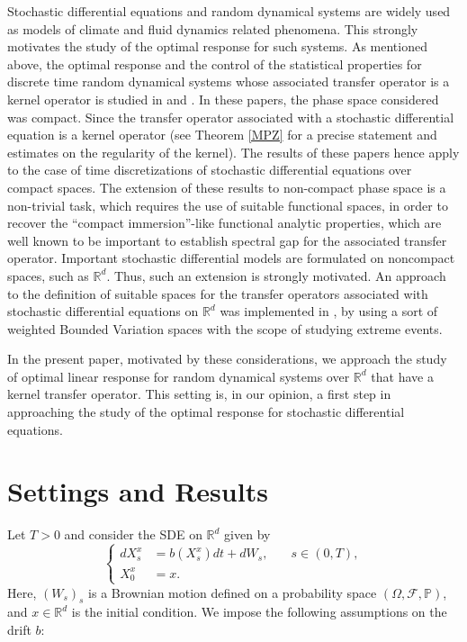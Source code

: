 \documentclass{amsart}
\begin{document}
  Stochastic differential equations and random dynamical systems are widely used as models of climate and fluid dynamics related phenomena.  This strongly motivates the study of the optimal response for such systems.
  As mentioned above, the  optimal response  and the control of the statistical properties for discrete time  random dynamical systems  whose associated transfer operator is a kernel operator is studied in \cite{AFG22} and \cite{GG19}. In these papers, the phase space considered was compact.
   Since the transfer operator associated with a stochastic differential equation is a kernel operator (see Theorem \ref{MPZ} for a precise statement and estimates on the regularity of the kernel).
The results of these papers hence apply to the case of time discretizations of stochastic differential equations over compact spaces. The extension of these results to non-compact phase space is a non-trivial task, which requires the use of suitable functional spaces, in order to recover the ``compact immersion''-like  functional analytic properties, which are well known to be important to establish  spectral gap  for the associated transfer operator. 
Important stochastic differential models are formulated on noncompact spaces, such as $\mathbb{R}^d$. 
Thus, such an extension is strongly motivated.
An approach to the definition of suitable spaces for the transfer operators associated with stochastic differential equations on $\mathbb{R}^d$ was implemented in \cite{FGGV24}, by using a sort of weighted Bounded Variation spaces with the scope of studying extreme events.

In the present paper, motivated by these considerations, we approach the study of optimal linear response for random dynamical systems over $\mathbb{R}^d$ that have a kernel transfer operator. 
This setting is, in our opinion, a first step in approaching the study of the optimal response for  stochastic differential equations.




\section{Settings and Results}\label{sec:sde}

Let $T>0$ and consider the SDE on $\mathbb{R}^d$ given by
\begin{equation}  \label{eq:system1}
\left \lbrace 
\begin{aligned}
dX_{s}^x & =b\left(X_{s}^x\right) dt+dW_{s}, &\quad s \in (0,T),\\ X_{0}^x &
=x.
\end{aligned}
\right.
\end{equation}
Here, $(W_{s})_s$ is a Brownian motion defined on a probability space $\left(
\Omega,\mathcal{F},\mathbb{P}\right)$, and $x \in \mathbb{R}^d$ is the initial condition. We impose the following assumptions on the drift $b$: 
\end{document}

